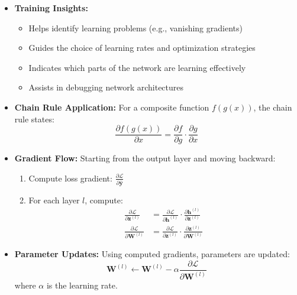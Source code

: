 \begin{itemize}
\begin{itemize}
        \item \textbf{Training Insights:}
            \begin{itemize}
                \item Helps identify learning problems (e.g., vanishing gradients)
                \item Guides the choice of learning rates and optimization strategies
                \item Indicates which parts of the network are learning effectively
                \item Assists in debugging network architectures
            \end{itemize}
    \end{itemize}

    \begin{itemize}
        \item \textbf{Chain Rule Application:} For a composite function $f(g(x))$, the chain rule states:
        \begin{equation}
            \frac{\partial f(g(x))}{\partial x} = \frac{\partial f}{\partial g} \cdot \frac{\partial g}{\partial x}
        \end{equation}
        
        \item \textbf{Gradient Flow:} Starting from the output layer and moving backward:
        \begin{enumerate}
            \item Compute loss gradient: $\frac{\partial \mathcal{L}}{\partial \hat{\mathbf{y}}}$
            \item For each layer $l$, compute:
                \begin{align}
                    \frac{\partial \mathcal{L}}{\partial \mathbf{z}^{(l)}} &= \frac{\partial \mathcal{L}}{\partial \mathbf{h}^{(l)}} \cdot \frac{\partial \mathbf{h}^{(l)}}{\partial \mathbf{z}^{(l)}} \\
                    \frac{\partial \mathcal{L}}{\partial \mathbf{W}^{(l)}} &= \frac{\partial \mathcal{L}}{\partial \mathbf{z}^{(l)}} \cdot \frac{\partial \mathbf{z}^{(l)}}{\partial \mathbf{W}^{(l)}}
                \end{align}
        \end{enumerate}
        
        \item \textbf{Parameter Updates:} Using computed gradients, parameters are updated:
        \begin{equation}
            \mathbf{W}^{(l)} \leftarrow \mathbf{W}^{(l)} - \alpha \frac{\partial \mathcal{L}}{\partial \mathbf{W}^{(l)}}
        \end{equation}
        where $\alpha$ is the learning rate.
    \end{itemize}


\end{itemize}
